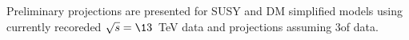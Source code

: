 Preliminary projections are presented for SUSY and DM
simplified models using currently recoreded $\sqrt{s}=\13$~TeV data and 
projections assuming $3$\ifb of data.




